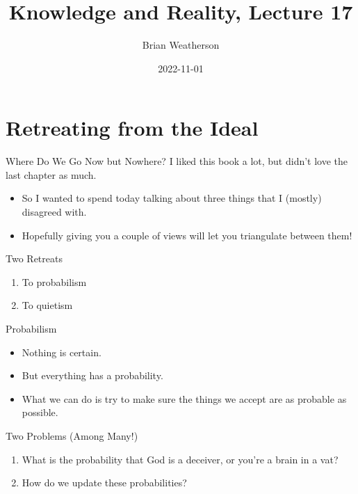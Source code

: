 \documentclass[
  17pt,
  letterpaper,
  ignorenonframetext,
  aspectratio=169,
  handout]{beamer}
\title{Knowledge and Reality, Lecture 17}
\author{Brian Weatherson}
\date{2022-11-01}
\providecommand{\tightlist}{%
  \setlength{\itemsep}{0pt}\setlength{\parskip}{0pt}}\usepackage{longtable,booktabs,array}
\begin{document}
\frame{\titlepage}
\ifdefined\Shaded\renewenvironment{Shaded}{\begin{tcolorbox}[boxrule=0pt, interior hidden, breakable, borderline west={3pt}{0pt}{shadecolor}, sharp corners, frame hidden, enhanced]}{\end{tcolorbox}}\fi

\hypertarget{retreating-from-the-ideal}{%
\section{Retreating from the Ideal}\label{retreating-from-the-ideal}}

\begin{frame}{Where Do We Go Now but Nowhere?}
\protect\hypertarget{where-do-we-go-now-but-nowhere}{}
I liked this book a lot, but didn't love the last chapter as much.

\begin{itemize}[<+->]
\tightlist
\item
  So I wanted to spend today talking about three things that I (mostly)
  disagreed with.
\item
  Hopefully giving you a couple of views will let you triangulate
  between them!
\end{itemize}
\end{frame}

\begin{frame}{Two Retreats}
\protect\hypertarget{two-retreats}{}
\begin{enumerate}[<+->]
\tightlist
\item
  To probabilism
\item
  To quietism
\end{enumerate}
\end{frame}

\begin{frame}{Probabilism}
\protect\hypertarget{probabilism}{}
\begin{itemize}[<+->]
\tightlist
\item
  Nothing is certain.
\item
  But everything has a probability.
\item
  What we can do is try to make sure the things we accept are as
  probable as possible.
\end{itemize}
\end{frame}

\begin{frame}{Two Problems (Among Many!)}
\protect\hypertarget{two-problems-among-many}{}
\begin{enumerate}[<+->]
\tightlist
\item
  What is the probability that God is a deceiver, or you're a brain in a
  vat?
\item
  How do we update these probabilities?
\end{enumerate}
\end{frame}
\end{document}
